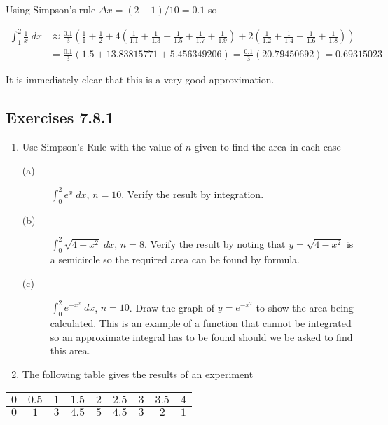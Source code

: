Using Simpson's rule $ \Delta x =(2 -1)/10 =0.1$ so 


\begin{align*}\int _{1}^{2}\frac{1}{x}\; d x &  \approx \frac{0.1}{3} \left (\frac{1}{1} +\frac{1}{2} +4 (\frac{1}{1.1} +\frac{1}{1.3} +\frac{1}{1.5} +\frac{1}{1.7} +\frac{1}{1.9}) +2 \left (\frac{1}{1.2} +\frac{1}{1.4} +\frac{1}{1.6} +\frac{1}{1.8}\right )\right ) \\
 &  = \frac{0.1}{3} \left (1.5 +13.83815771 +5.456349206\right ) =\frac{0.1}{3} \left (20.79450692\right ) =0.69315023\end{align*}

It is immediately clear that this is a very good approximation. 

\subsection{Exercises 7.8.1}
\begin{enumerate}
\item Use Simpson's Rule with the value of $n$ given to find the area in each case 


\begin{description}
\item [(a)] $\int _{0}^{2}e^{x}\; d x$, $n =10$. Verify the result by integration. 

\item [(b)]
$\int _{0}^{2}\sqrt{4 -x^{2}}\; d x$, $n =8$. Verify the result by noting that $y =\sqrt{4 -x^{2}}$ is a semicircle so the required area can be found by formula. 

\item [(c)]
$\int _{0}^{2}e^{ -x^{2}}\; d x$, $n =10$. Draw the graph of $y =e^{ -x^{2}}$ to show the area being calculated. This is an example of a function that cannot be integrated
so an approximate integral has to be found should we be asked to find this area. \end{description}

\item The
following table gives the results of an experiment \end{enumerate}


\qquad \qquad \qquad \qquad \qquad
\begin{tabular}[c]{|c|c|c|c|c|c|c|c|c|}\hline
$0$  & $0.5$  & $1$  & $1.5$  & $2$  & $2.5$  & $3$  & $3.5$  & $4$  \\
\hline
$0$  & $1$  & $3$  & $4.5$  & $5$  & $4.5$  & $3$  & $2$  & $1$  \\
\hline
\end{tabular}


